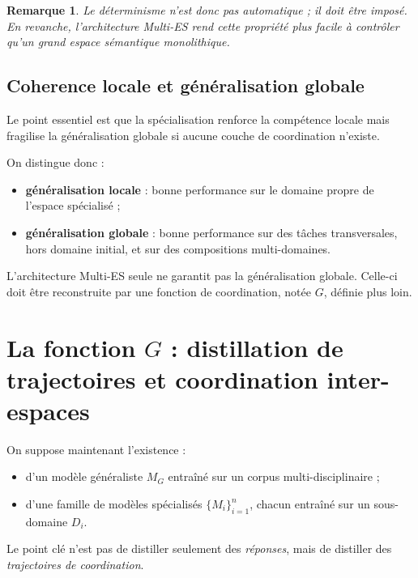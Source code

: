 \documentclass[11pt,a4paper]{article}
\newtheorem{remark}{Remarque}[section]
\newcommand{\1}{\mathbf 1}
\begin{document}
\begin{remark}
Le déterminisme n'est donc pas automatique ; il doit être imposé. En revanche, l'architecture Multi-ES rend cette propriété plus facile à contrôler qu'un grand espace sémantique monolithique.
\end{remark}

\subsection{Coherence locale et généralisation globale}

Le point essentiel est que la spécialisation renforce la compétence locale mais fragilise la généralisation globale si aucune couche de coordination n'existe.

On distingue donc :

\begin{itemize}[leftmargin=2em]
    \item \textbf{généralisation locale} : bonne performance sur le domaine propre de l'espace spécialisé ;
    \item \textbf{généralisation globale} : bonne performance sur des tâches transversales, hors domaine initial, et sur des compositions multi-domaines.
\end{itemize}

L'architecture Multi-ES seule ne garantit pas la généralisation globale. Celle-ci doit être reconstruite par une fonction de coordination, notée \(G\), définie plus loin.

\section{La fonction \(G\) : distillation de trajectoires et coordination inter-espaces}

On suppose maintenant l'existence :

\begin{itemize}[leftmargin=2em]
    \item d'un modèle généraliste \(M_G\) entraîné sur un corpus multi-disciplinaire ;
    \item d'une famille de modèles spécialisés \(\{M_i\}_{i=1}^n\), chacun entraîné sur un sous-domaine \(D_i\).
\end{itemize}

Le point clé n'est pas de distiller seulement des \emph{réponses}, mais de distiller des \emph{trajectoires de coordination}.
\end{document}
